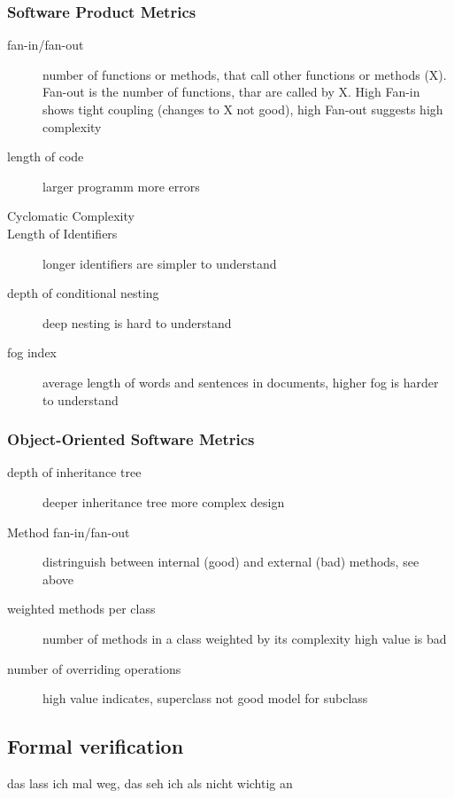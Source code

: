 \documentclass[a4paper, 10pt]{article}
\begin{document}
\subsubsection{Software Product Metrics}
\begin{description}
	\item[fan-in/fan-out] number of functions or methods, that call other functions or methods (X). Fan-out is the number of functions, thar are called by X. High Fan-in shows tight coupling (changes to X not good), high Fan-out suggests high complexity
	\item[length of code] larger programm \follows more errors
	\item[Cyclomatic Complexity]
	\item[Length of Identifiers] longer identifiers are simpler to understand
	\item[depth of conditional nesting] deep nesting is hard to understand
	\item[fog index] average length of words and sentences in documents, higher fog is harder to understand
 \end{description}

\subsubsection{Object-Oriented Software Metrics}
\begin{description}
	\item[depth of inheritance tree] deeper inheritance tree \follows more complex design
	\item[Method fan-in/fan-out] distringuish between internal (good) and external (bad) methods, see above
	\item[weighted methods per class] number of methods in a class weighted by its complexity \follows high value is bad
	\item[number of overriding operations] high value indicates, superclass not good model for subclass
\end{description}

\subsection{Formal verification}
das lass ich mal weg, das seh ich als nicht wichtig an
\end{document}
